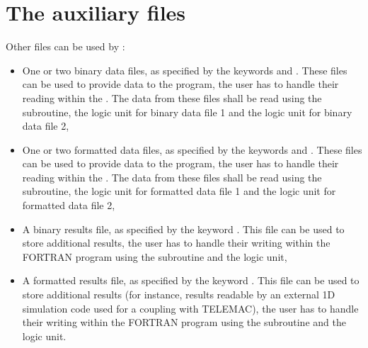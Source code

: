%
%
%
\section{The auxiliary files}

Other files can be used by :

\begin{itemize}
\item One or two binary data files, as specified by the keywords
 and . These files can be
used to provide data to the program, the user has to handle their reading
within the . The data from these files shall be read using
the  subroutine,
the  logic unit for binary data file 1 and the 
logic unit for binary data file 2,

\item One or two formatted data files, as specified by the keywords
 and . These files
can be used to provide data to the program, the user has to handle their
reading within the . The data from these files shall be
read using the  subroutine,
the  logic unit for formatted data file 1 and the
 logic unit for formatted data file 2,

\item A binary results file, as specified by the keyword . This file can be used to store
additional results, the user has to handle their writing within the FORTRAN
program using the  subroutine
and the  logic unit,

\item A formatted results file, as specified by the keyword . This file can be used to store additional results (for instance,
results readable by an external 1D simulation code used for a coupling with
TELEMAC), the user has to handle their writing within the FORTRAN program using
the  subroutine and the  logic unit.
\end{itemize}

